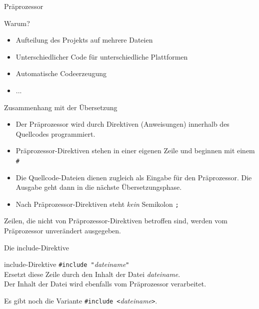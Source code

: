 \begin{frame}{Präprozessor}
	\begin{block}{Warum?}
		\begin{itemize}
			\item Aufteilung des Projekts auf mehrere Dateien
			\item Unterschiedlicher Code für unterschiedliche Plattformen
			\item Automatische Codeerzeugung
			\item ...
		\end{itemize}
	\end{block}
\end{frame}

\begin{frame}[fragile]{Zusammenhang mit der Übersetzung}
	\begin{itemize}
		\item Der Präprozessor wird durch Direktiven (Anweisungen) innerhalb des Quellcodes programmiert.
		\item Präprozessor-Direktiven stehen in einer eigenen Zeile und beginnen mit einem \verb|#|
		\item Die Quellcode-Dateien dienen zugleich als Eingabe für den Präprozessor. Die Ausgabe geht dann in die nächste Übersetzungsphase.
		\item Nach Präprozessor-Direktiven steht \emph{kein} Semikolon \verb|;|
	\end{itemize}
	
	\pause
	\vspace{1em}
	
 	Zeilen, die nicht von Präprozessor-Direktiven betroffen sind, werden vom Präprozessor unverändert ausgegeben.
\end{frame}

\begin{frame}[fragile]{Die include-Direktive}
	\begin{block}{include-Direktive}
		\verb|#include "|\emph{dateiname}\verb|"| \\
		\vspace{0.5em}
		Ersetzt diese Zeile durch den Inhalt der Datei \emph{dateiname}. \\
		Der Inhalt der Datei wird ebenfalls vom Präprozessor verarbeitet.
	\end{block}
	
	\pause
	\vspace{1em}
	
	\small
	Es gibt noch die Variante \verb|#include <|\emph{dateiname}\verb|>|.
\end{frame}


